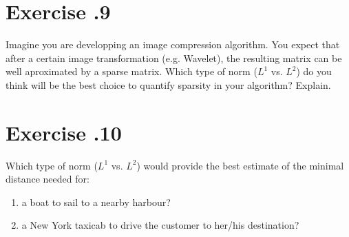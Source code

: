 \documentclass{article}
\begin{document}
\section*{Exercise \chapnumber.9}
Imagine you are developping an image compression algorithm. You expect that after a certain image transformation (e.g. Wavelet), the resulting matrix can be well aproximated by a sparse matrix. Which type of norm ($\textit{L}^{1}$ vs. $\textit{L}^{2}$) do you think will be the best choice to quantify sparsity in your algorithm? Explain.

\section*{Exercise \chapnumber.10}

Which type of norm ($\textit{L}^{1}$ vs. $\textit{L}^{2}$) would provide the best estimate of the minimal distance needed for:

\begin{enumerate}[label=(\alph*)]
\item a boat to sail to a nearby harbour?

\item a New York taxicab to drive the customer to her/his destination?
\end{enumerate}
\end{document}
